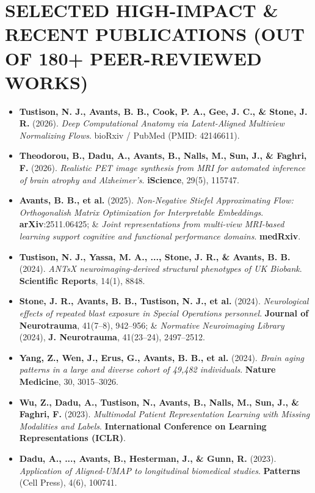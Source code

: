 \documentclass[10pt,letterpaper]{article}
\begin{document}
\section{SELECTED HIGH-IMPACT \& RECENT PUBLICATIONS {\normalfont\scriptsize\color{textmuted}(OUT OF 180+ PEER-REVIEWED WORKS)}}
{\footnotesize
\begin{itemize}[itemsep=1pt]
  \item \textbf{Tustison, N. J., Avants, B. B., Cook, P. A., Gee, J. C., \& Stone, J. R.} (2026). \textit{Deep Computational Anatomy via Latent-Aligned Multiview Normalizing Flows}. bioRxiv / PubMed (PMID: 42146611).
  \item \textbf{Theodorou, B., Dadu, A., Avants, B., Nalls, M., Sun, J., \& Faghri, F.} (2026). \textit{Realistic PET image synthesis from MRI for automated inference of brain atrophy and Alzheimer's}. \textbf{iScience}, 29(5), 115747.
  \item \textbf{Avants, B. B., et al.} (2025). \textit{Non-Negative Stiefel Approximating Flow: Orthogonalish Matrix Optimization for Interpretable Embeddings}. \textbf{arXiv}:2511.06425; \& \textit{Joint representations from multi-view MRI-based learning support cognitive and functional performance domains}. \textbf{medRxiv}.
  \item \textbf{Tustison, N. J., Yassa, M. A., ..., Stone, J. R., \& Avants, B. B.} (2024). \textit{ANTsX neuroimaging-derived structural phenotypes of UK Biobank}. \textbf{Scientific Reports}, 14(1), 8848.
  \item \textbf{Stone, J. R., Avants, B. B., Tustison, N. J., et al.} (2024). \textit{Neurological effects of repeated blast exposure in Special Operations personnel}. \textbf{Journal of Neurotrauma}, 41(7--8), 942--956; \& \textit{Normative Neuroimaging Library} (2024), \textbf{J. Neurotrauma}, 41(23--24), 2497--2512.
  \item \textbf{Yang, Z., Wen, J., Erus, G., Avants, B. B., et al.} (2024). \textit{Brain aging patterns in a large and diverse cohort of 49,482 individuals}. \textbf{Nature Medicine}, 30, 3015--3026.
  \item \textbf{Wu, Z., Dadu, A., Tustison, N., Avants, B., Nalls, M., Sun, J., \& Faghri, F.} (2023). \textit{Multimodal Patient Representation Learning with Missing Modalities and Labels}. \textbf{International Conference on Learning Representations (ICLR)}.
  \item \textbf{Dadu, A., ..., Avants, B., Hesterman, J., \& Gunn, R.} (2023). \textit{Application of Aligned-UMAP to longitudinal biomedical studies}. \textbf{Patterns} (Cell Press), 4(6), 100741.

\end{itemize}}
\end{document}
